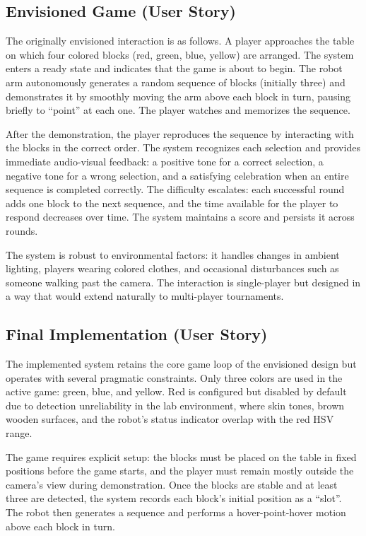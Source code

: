\documentclass[conference]{IEEEtran}
\begin{document}
\subsection{Envisioned Game (User Story)}

The originally envisioned interaction is as follows. A player approaches
the table on which four colored blocks (red, green, blue, yellow) are
arranged. The system enters a ready state and indicates that the game
is about to begin. The robot arm autonomously generates a random sequence
of blocks (initially three) and demonstrates it by smoothly moving the
arm above each block in turn, pausing briefly to ``point'' at each one.
The player watches and memorizes the sequence.

After the demonstration, the player reproduces the sequence by interacting
with the blocks in the correct order. The system recognizes each selection
and provides immediate audio-visual feedback: a positive tone for a correct
selection, a negative tone for a wrong selection, and a satisfying
celebration when an entire sequence is completed correctly. The difficulty
escalates: each successful round adds one block to the next sequence, and
the time available for the player to respond decreases over time. The
system maintains a score and persists it across rounds.

The system is robust to environmental factors: it handles changes in
ambient lighting, players wearing colored clothes, and occasional
disturbances such as someone walking past the camera. The interaction
is single-player but designed in a way that would extend naturally to
multi-player tournaments.

\subsection{Final Implementation (User Story)}

The implemented system retains the core game loop of the envisioned
design but operates with several pragmatic constraints. Only three
colors are used in the active game: green, blue, and yellow. Red is
configured but disabled by default due to detection unreliability in
the lab environment, where skin tones, brown wooden surfaces, and the
robot's status indicator overlap with the red HSV range.

The game requires explicit setup: the blocks must be placed on the
table in fixed positions before the game starts, and the player must
remain mostly outside the camera's view during demonstration. Once
the blocks are stable and at least three are detected, the system
records each block's initial position as a ``slot''. The robot then
generates a sequence and performs a hover-point-hover motion above
each block in turn.
\end{document}
